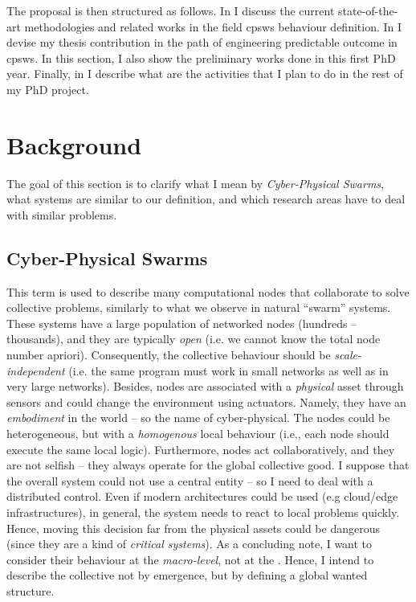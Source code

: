 \documentclass[11pt]{article}
\begin{document}
The proposal is then structured as follows. In  I discuss the current state-of-the-art methodologies and related works in the field \acp{cpsw} behaviour definition.
%
In  I devise my thesis contribution in the path of engineering predictable outcome in \acp{cpsw}. 
%
In this section, I also show the preliminary works done in this first PhD year.
%
Finally, in  I describe what are the activities that I plan to do in the rest of my PhD project.

\section{Background} \label{background}
The goal of this section is to clarify what I mean by \textit{Cyber-Physical Swarms}, what systems are similar to our definition, and which research areas have to deal with similar problems.
\subsection{Cyber-Physical Swarms}
This term is used to describe many computational nodes that collaborate to solve collective problems, similarly to what we observe in natural ``swarm'' systems.
%
These systems have a large population of networked nodes (hundreds -- thousands), and they are typically \textit{open} (i.e. we cannot know the total node number apriori). 
%
Consequently, the collective behaviour should be \textit{scale-independent} (i.e. the same program must work in small networks as well as in very large networks).
%
Besides, nodes are associated with a \textit{physical} asset through sensors and could change the environment using actuators. 
%
Namely, they have an \emph{embodiment} in the world -- so the name of cyber-physical. 
%
The nodes could be heterogeneous, but with a \emph{homogenous} local behaviour (i.e., each node should execute the same local logic). 
%
Furthermore, nodes act collaboratively, and they are not selfish -- they always operate for the global collective good.
%
I suppose that the overall system could not use a central entity -- so I need to deal with a distributed control. 
%
Even if modern architectures could be used (e.g cloud/edge infrastructures), in general, the system needs to react to local problems quickly. 
%
Hence, moving this decision far from the physical assets could be dangerous (since they are a kind of \emph{critical systems}).
%
As a concluding note, I want to consider their behaviour at the \textit{macro-level}, not at the . 
%
Hence, I intend to describe the collective not by emergence, but by defining a global wanted structure.
\end{document}
